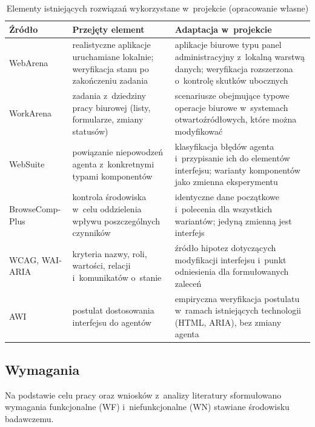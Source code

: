 \begin{table}[H]
\centering
\caption{Elementy istniejących rozwiązań wykorzystane w~projekcie (opracowanie własne)}
\label{tab:inspiracje}
\footnotesize
\begin{tabularx}{\textwidth}{>{\raggedright\arraybackslash}p{2.6cm}>{\raggedright\arraybackslash}X>{\raggedright\arraybackslash}X}
\toprule
\textbf{Źródło} & \textbf{Przejęty element} & \textbf{Adaptacja w~projekcie} \\
\midrule
WebArena \citep{zhou2024webarena} & realistyczne aplikacje uruchamiane lokalnie; weryfikacja stanu po zakończeniu zadania & aplikacje biurowe typu panel administracyjny z~lokalną warstwą danych; weryfikacja rozszerzona o~kontrolę skutków ubocznych \\
\addlinespace
WorkArena \citep{drouin2024workarena} & zadania z~dziedziny pracy biurowej (listy, formularze, zmiany statusów) & scenariusze obejmujące typowe operacje biurowe w~systemach otwartoźródłowych, które można modyfikować \\
\addlinespace
WebSuite \citep{li2024websuite} & powiązanie niepowodzeń agenta z~konkretnymi typami komponentów & klasyfikacja błędów agenta i~przypisanie ich do elementów interfejsu; warianty komponentów jako zmienna eksperymentu \\
\addlinespace
BrowseComp-Plus \citep{chen2025browsecompplus} & kontrola środowiska w~celu oddzielenia wpływu poszczególnych czynników & identyczne dane początkowe i~polecenia dla wszystkich wariantów; jedyną zmienną jest interfejs \\
\addlinespace
WCAG, WAI-ARIA \citep{w3c2023wcag22, w3c2023aria12} & kryteria nazwy, roli, wartości, relacji i~komunikatów o~stanie & źródło hipotez dotyczących modyfikacji interfejsu i~punkt odniesienia dla formułowanych zaleceń \\
\addlinespace
AWI \citep{lu2025awi} & postulat dostosowania interfejsu do agentów & empiryczna weryfikacja postulatu w~ramach istniejących technologii (HTML, ARIA), bez zmiany agenta \\
\bottomrule
\end{tabularx}
\end{table}

\subsection{Wymagania}
\label{sec:wymagania}
Na podstawie celu pracy oraz wniosków z~analizy literatury sformułowano wymagania funkcjonalne (WF) i~niefunkcjonalne (WN) stawiane środowisku badawczemu.

